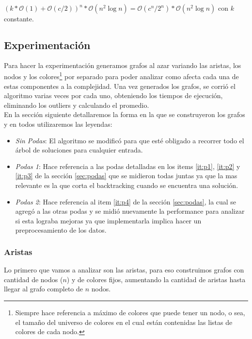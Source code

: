 \begin{center}
$(k*\mathcal{O}(1) + \mathcal{O}(c/2))^n * \mathcal{O}(n^2 \log{n}) = \mathcal{O}(c^n/2^n) * \mathcal{O}(n^2 \log{n})$ con $k$ constante.
\end{center}

\subsection{Experimentación}
Para hacer la experimentación generamos grafos al azar variando las aristas, los nodos y los colores\footnote{Siempre hace referencia a máximo de colores que puede tener un nodo, o sea, el tamaño del universo de colores en el cual están contenidas las listas de colores de cada nodo.} por separado para poder analizar como afecta cada una de estas componentes a la complejidad. Una vez generados los grafos, se corrió el algoritmo varias veces por cada uno, obteniendo los tiempos de ejecución, eliminando los outliers y calculando el promedio.\\

En la sección siguiente detallaremos la forma en la que se construyeron los grafos y en todos utilizaremos las leyendas:
\begin{itemize}
	\item \emph{Sin Podas}: El algoritmo se modificó para que esté obligado a recorrer todo el árbol de soluciones para cualquier entrada.

	\item \emph{Podas 1}: Hace referencia a las podas detalladas en los items \ref{it:p1}, \ref{it:p2} y \ref{it:p3} de la sección \ref{sec:podas} que se midieron todas juntas ya que la mas relevante es la que corta el backtracking cuando se encuentra una solución.

	\item \emph{Podas 2}: Hace referencia al item \ref{it:p4} de la sección \ref{sec:podas}, la cual se agregó a las otras podas y se midió nuevamente la performance para analizar si esta lograba mejoras ya que implementarla implica hacer un preprocesamiento de los datos.
\end{itemize}

\subsubsection{Aristas}

Lo primero que vamos a analizar son las aristas, para eso construimos grafos con cantidad de nodos ($n$) y de colores fijos, aumentando la cantidad de aristas hasta llegar al grafo completo de $n$ nodos.

